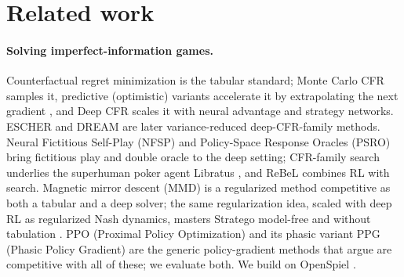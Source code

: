 \documentclass[11pt,a4paper]{article}
\begin{document}
\section{Related work}

\paragraph{Solving imperfect-information games.} Counterfactual regret minimization
\citep{cfr2007} is the tabular standard; Monte Carlo CFR \citep{mccfr2009} samples
it, predictive (optimistic) variants accelerate it by extrapolating the next gradient
\citep{predictivecfr2021}, and Deep CFR \citep{deepcfr2019} scales it with neural
advantage and strategy networks. ESCHER \citep{escher2022} and DREAM \citep{dream2020}
are later variance-reduced deep-CFR-family methods. Neural Fictitious Self-Play (NFSP)
\citep{nfsp2016} and Policy-Space Response Oracles (PSRO) \citep{psro2017} bring
fictitious play and double oracle to the deep setting; CFR-family search underlies the
superhuman poker agent Libratus \citep{libratus2018}, and ReBeL \citep{rebel2020}
combines RL with search. Magnetic mirror descent (MMD) \citep{mmd2023} is a regularized
method competitive as both a tabular and a deep solver; the same regularization idea,
scaled with deep RL as regularized Nash dynamics, masters Stratego model-free and
without tabulation \citep{deepnash2022}. PPO (Proximal Policy
Optimization) \citep{ppo2017} and its phasic variant PPG (Phasic Policy Gradient)
\citep{ppg2021} are the generic policy-gradient methods that
\citet{rudolph2026} argue are competitive with all of these; we evaluate both. We
build on OpenSpiel \citep{openspiel2019}.
\end{document}
